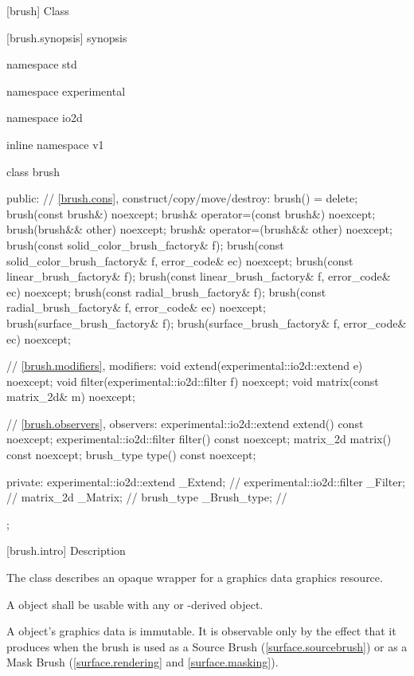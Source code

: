  [brush] {Class }

 [brush.synopsis] { synopsis}

\begin{codeblock}
namespace std { namespace experimental { namespace io2d { inline namespace v1 {
  class brush {
  public:
    // \ref{brush.cons}, construct/copy/move/destroy:
    brush() = delete;
    brush(const brush&) noexcept;
    brush& operator=(const brush&) noexcept;
    brush(brush&& other) noexcept;
    brush& operator=(brush&& other) noexcept;
    brush(const solid_color_brush_factory& f);
    brush(const solid_color_brush_factory& f, error_code& ec) noexcept;
    brush(const linear_brush_factory& f);
    brush(const linear_brush_factory& f, error_code& ec) noexcept;
    brush(const radial_brush_factory& f);
    brush(const radial_brush_factory& f, error_code& ec) noexcept;
    brush(surface_brush_factory& f);
    brush(surface_brush_factory& f, error_code& ec) noexcept;

    // \ref{brush.modifiers}, modifiers:
    void extend(experimental::io2d::extend e) noexcept;
    void filter(experimental::io2d::filter f) noexcept;
    void matrix(const matrix_2d& m) noexcept;

    // \ref{brush.observers}, observers:
    experimental::io2d::extend extend() const noexcept;
    experimental::io2d::filter filter() const noexcept;
    matrix_2d matrix() const noexcept;
    brush_type type() const noexcept;

  private:
    experimental::io2d::extend _Extend; // \expos
    experimental::io2d::filter _Filter; // \expos
    matrix_2d _Matrix;                         // \expos
    brush_type _Brush_type;                    // \expos
  };
} } } }
\end{codeblock}

 [brush.intro] { Description}

\pnum
{}
The class  describes an opaque wrapper for a graphics data graphics resource.

\pnum
A  object shall be usable with any  or -derived object.

\pnum
A  object's graphics data is immutable. It is observable only by the effect that it produces when the brush is used as a Source Brush (\ref{surface.sourcebrush}) or as a Mask Brush (\ref{surface.rendering} and \ref{surface.masking}).

